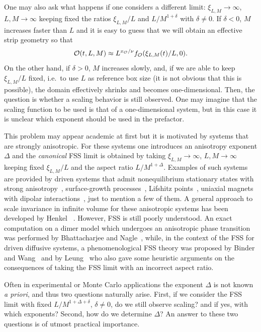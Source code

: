 \documentclass[a4paper,12pt]{article}
\begin{document}
One may also ask what happens if one considers a different limit:
$\xi_{L,M}\to\infty$,
$L,M\to\infty$ keeping fixed the ratios $\xi_{L,M}/L$ and $L/M^{1+\delta}$
with $\delta\not= 0$. If $\delta < 0$, $M$ increases faster than
$L$ and it is easy to guess that we will obtain an effective
strip geometry so that
\begin{equation}
{\cal O}(t,L,M) \approx L^{x_{\cal O}/\nu} f_{\cal O} (\xi_{L,M}(t)/L,0).
\end{equation}
On the other hand, if $\delta > 0$, $M$ increases slowly, and, if we 
are able to keep
$\xi_{L,M}/L$ fixed, i.e.~to use $L$ as reference box size 
(it is not obvious that this is possible), the domain
effectively shrinks and becomes one-dimensional. Then, the question is 
whether
a scaling behavior is still observed. One may imagine that
the scaling function to be used is that of a one-dimensional system,
but in this case it is unclear which exponent should be used in the
prefactor.

This problem may appear academic at first but it is motivated by 
systems that are strongly anisotropic. For these
systems one introduces an anisotropy exponent $\Delta$ and the
{\em canonical} FSS limit is obtained by taking
$\xi_{L,M}\to\infty$, $L,M\to\infty$
keeping fixed $\xi_{L,M}/L$ and the aspect ratio $L/M^{1+\Delta}$.
Examples of such systems are provided by driven systems that admit
nonequilibrium stationary states with strong anisotropy~\cite{SchmZia,MD-99},
surface-growth processes~\cite{Krug}, 
Lifshitz points~\cite{Hornreich-80,Selke-92,PH-01,Diehl}, 
uniaxial magnets with dipolar
interactions~\cite{AF-73,BZ-76}, just to mention a few of them. 
A general approach to scale invariance in infinite volume for these 
anisotropic systems has been developed by Henkel ~\cite{Henkel}. 
However, FSS is still poorly understood. 
An exact computation on a dimer model which undergoes an 
anisotropic phase transition was performed by 
Bhattacharjee and Nagle~\cite{dimer}, while, in the context of the FSS for 
driven diffusive systems, a phenomenological FSS theory was proposed 
by Binder and Wang~\cite{binder} and by Leung~\cite{Leung-91,Leung-92}
who also gave some heuristic arguments on the consequences of taking the  
FSS limit with an incorrect aspect ratio.

Often in experimental or Monte Carlo applications the exponent $\Delta$ 
is not known {\em a priori}, and thus two questions naturally arise. 
First, if we
consider the FSS limit with fixed $L/M^{1+\Delta + \delta}$, $\delta \neq 0$,
do we still observe scaling? and if yes, with which exponents?
Second, how do we determine $\Delta$? An answer to these two questions
is of utmost practical importance.
\end{document}
